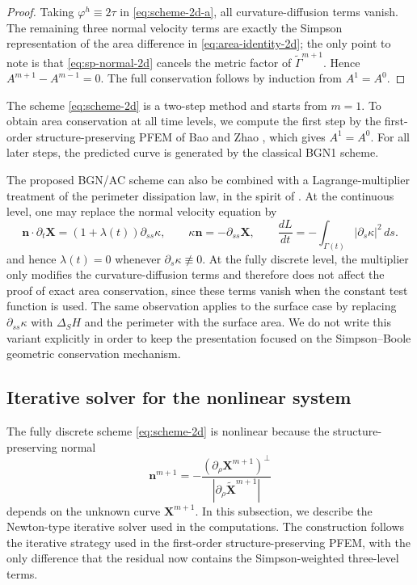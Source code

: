\documentclass[smallextended]{svjour3}
\numberwithin{equation}{section}
\begin{document}
	\begin{proof}
		Taking $\varphi^h\equiv2\tau$ in \eqref{eq:scheme-2d-a}, all curvature-diffusion terms vanish. The remaining three normal velocity terms are exactly the Simpson representation of the area difference in \eqref{eq:area-identity-2d}; the only point to note is that \eqref{eq:sp-normal-2d} cancels the metric factor of $\widetilde{\Gamma}^{m+1}$. Hence $A^{m+1}-A^{m-1}=0$. The full conservation follows by induction from $A^1=A^0$.
	\end{proof}
	
	\begin{remark}
		The scheme \eqref{eq:scheme-2d} is a two-step method and starts from $m=1$. To obtain area conservation at all time levels, we compute the first step by the first-order structure-preserving PFEM of Bao and Zhao \cite{bao2021structure}, which gives $A^1=A^0$. For all later steps, the predicted curve is generated by the classical BGN1 scheme.
	\end{remark}
	
\begin{remark}
	The proposed BGN/AC scheme can also be combined with a Lagrange-multiplier treatment of the perimeter dissipation law, in the spirit of \cite{garcke2025structure}. At the continuous level, one may replace the normal velocity equation by
	\[
	\mathbf n\cdot\partial_t\mathbf X=(1+\lambda(t))\partial_{ss}\kappa,
	\qquad
	\kappa\mathbf n=-\partial_{ss}\mathbf X,
	\qquad
	\frac{dL}{dt}=-\int_{\Gamma(t)}|\partial_s\kappa|^2\,ds .
	\]
	and hence $\lambda(t)=0$ whenever $\partial_s\kappa\not\equiv0$.  At the fully discrete level, the multiplier only modifies the curvature-diffusion terms and therefore does not affect the proof of exact area conservation, since these terms vanish when the constant test function is used. The same observation applies to the surface case by replacing $\partial_{ss}\kappa$ with $\Delta_S H$ and the perimeter with the surface area. We do not write this variant explicitly in order to keep the presentation focused on the Simpson--Boole geometric conservation mechanism.
\end{remark}
	
	\subsection{Iterative solver for the nonlinear system}
	\label{subsec:solver-2d}
	
	The fully discrete scheme \eqref{eq:scheme-2d} is nonlinear because the structure-preserving normal
	\[
	\mathbf{n}^{m+1}
	=
	-\frac{(\partial_\rho\mathbf{X}^{m+1})^\perp}
	{|\partial_\rho\widetilde{\mathbf{X}}^{m+1}|}
	\]
	depends on the unknown curve $\mathbf{X}^{m+1}$. In this subsection, we describe the Newton-type iterative solver used in the computations. The construction follows the iterative strategy used in the first-order structure-preserving PFEM, with the only difference that the residual now contains the Simpson-weighted three-level terms.
	
\end{document}
